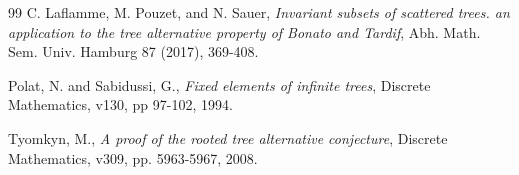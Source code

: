 \documentclass[12pt]{amsart}
\numberwithin{mytheorem}{section} %
\numberwithin{mylemma}{section} %
\numberwithin{mycorollary}{section} %
\begin{document}
\begin{thebibliography}{99}
 C. Laflamme, M. Pouzet, and N. Sauer, {\it Invariant subsets of scattered trees. an application to the tree alternative property of Bonato and Tardif}, Abh. Math. Sem. Univ. Hamburg 87 (2017), 369-408. 




 Polat, N. and Sabidussi, G., {\it Fixed elements of infinite trees}, Discrete Mathematics, v130, pp 97-102, 1994.

 Tyomkyn, M., {\it A proof of the rooted tree alternative conjecture}, Discrete Mathematics, v309, pp. 5963-5967, 2008.

\end{thebibliography}
\end{document}
